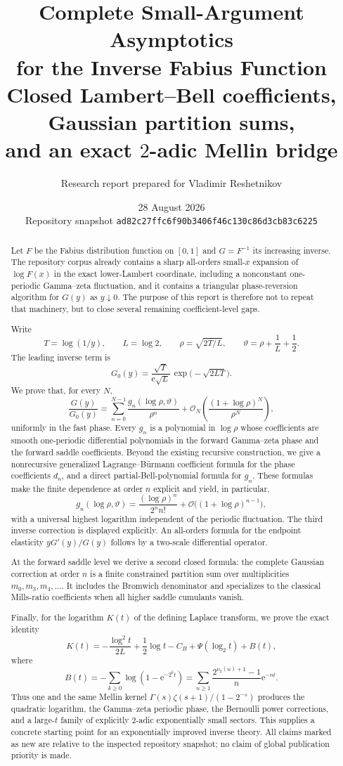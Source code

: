 \documentclass[11pt,oneside]{article}
\title{\bfseries Complete Small-Argument Asymptotics\\
for the Inverse Fabius Function\\[0.45em]
\large Closed Lambert--Bell coefficients, Gaussian partition sums,\\
and an exact $2$-adic Mellin bridge}
\author{Research report prepared for Vladimir Reshetnikov}
\date{28 August 2026\\[0.25em]
\small Repository snapshot \texttt{ad82c27ffc6f90b3406f46c130c86d3cb83c6225}}
\numberwithin{equation}{section}
\theoremstyle{definition}
\theoremstyle{remark}
\newcommand{\e}{\mathrm e}
\newcommand{\bigO}{\mathcal O}
\newcommand{\vTwo}{\nu_2}
\newcommand{\phase}{\vartheta}
\begin{document}
\maketitle

\begin{abstract}
Let $F$ be the Fabius distribution function on $[0,1]$ and $G=F^{-1}$ its
increasing inverse.  The repository corpus already contains a sharp all-orders
small-$x$ expansion of $\log F(x)$ in the exact lower-Lambert coordinate,
including a nonconstant one-periodic Gamma--zeta fluctuation, and it contains a
triangular phase-reversion algorithm for $G(y)$ as $y\downarrow0$.  The purpose
of this report is therefore not to repeat that machinery, but to close several
remaining coefficient-level gaps.

Write
\[
 T=\log(1/y),\qquad L=\log2,\qquad
 \rho=\sqrt{2T/L},\qquad
 \phase=\rho+\frac1L+\frac12.
\]
The leading inverse term is
\[
 G_0(y)=\frac{\sqrt T}{\e\sqrt L}\,
        \exp\!\bigl(-\sqrt{2LT}\bigr).
\]
We prove that, for every $N$,
\[
 \frac{G(y)}{G_0(y)}=
 \sum_{n=0}^{N-1}\frac{g_n(\log\rho,\phase)}{\rho^n}
 +\bigO_N\!\left(\frac{(1+\log\rho)^N}{\rho^N}\right),
\]
uniformly in the fast phase.  Every $g_n$ is a polynomial in $\log\rho$ whose
coefficients are smooth one-periodic differential polynomials in the forward
Gamma--zeta phase and the forward saddle coefficients.  Beyond the existing
recursive construction, we give a nonrecursive generalized
Lagrange--Bürmann coefficient formula for the phase coefficients $d_n$, and a
direct partial-Bell-polynomial formula for $g_n$.  These formulas make the
finite dependence at order $n$ explicit and yield, in particular,
\[
 g_n(\log\rho,\phase)
 =\frac{(\log\rho)^n}{2^n n!}
  +\bigO\bigl((1+\log\rho)^{n-1}\bigr),
\]
with a universal highest logarithm independent of the periodic fluctuation.
The third inverse correction is displayed explicitly.  An all-orders formula
for the endpoint elasticity $yG'(y)/G(y)$ follows by a two-scale differential
operator.

At the forward saddle level we derive a second closed formula: the complete
Gaussian correction at order $n$ is a finite constrained partition sum over
multiplicities $m_0,m_3,m_4,\ldots$.  It includes the Bromwich denominator and
specializes to the classical Mills-ratio coefficients when all higher saddle
cumulants vanish.

Finally, for the logarithm $K(t)$ of the defining Laplace transform, we prove
the exact identity
\[
 K(t)=-\frac{\log^2t}{2L}+\frac12\log t-C_B
      +\Psi(\log_2t)+B(t),
\]
where
\[
 B(t)=-\sum_{k\ge0}\log(1-\e^{-2^kt})
     =\sum_{n\ge1}\frac{2^{\vTwo(n)+1}-1}{n}\e^{-nt}.
\]
Thus one and the same Mellin kernel
$\Gamma(s)\zeta(s+1)/(1-2^{-s})$ produces the quadratic logarithm, the
Gamma--zeta periodic phase, the Bernoulli power corrections, and a large-$t$
family of explicitly $2$-adic exponentially small sectors.  This supplies a
concrete starting point for an exponentially improved inverse theory.  All
claims marked as new are relative to the inspected repository snapshot; no
claim of global publication priority is made.
\end{abstract}
\end{document}
